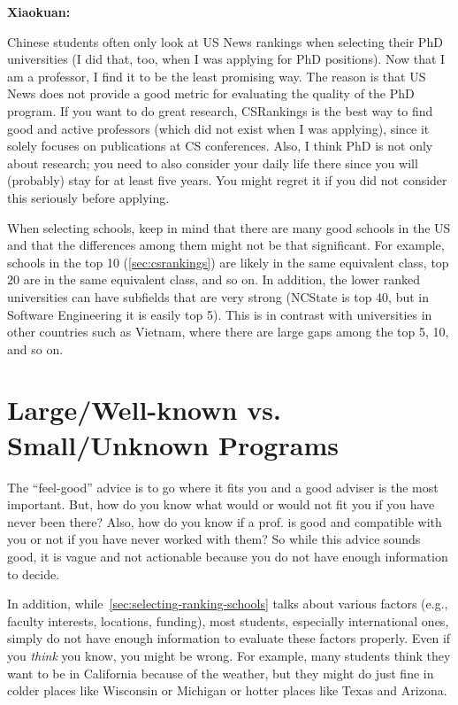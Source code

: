 \documentclass[oneside,11pt]{book}
\newenvironment{commentbox}[1][]{
  \small
  \begin{marker}[\faChessPawn{}]
    {\textbf{#1}}
  }{
  \end{marker}
}
\begin{document}
\begin{commentbox}[Xiaokuan:]
  Chinese students often only look at US News rankings when selecting their PhD universities (I did that, too, when I was applying for PhD positions).
  Now that I am a professor, I find it to be the least promising way.
  The reason is that US News does not provide a good metric for evaluating the quality of the PhD program.
  If you want to do great research, CSRankings is the best way to find good and active professors (which did not exist when I was applying),
  since it solely focuses on publications at  CS conferences.
  Also,
  I think PhD is not only about research;
  you need to also consider your daily life there since you will (probably) stay for at least five years.
  You might regret it if you did not consider this seriously before applying.
\end{commentbox}

\begin{commentbox}
When selecting schools, keep in mind that there are many good schools in the US and that the differences among them might not be that significant.  For example,  schools in the top 10 (\autoref{sec:csrankings}) are likely in the same equivalent class, top 20 are in the same equivalent class, and so on. In addition, the lower ranked universities can have subfields that are very strong (NCState is top 40, but in Software Engineering it is easily top 5).  This is in contrast with universities in other countries such as Vietnam, where there are large gaps among the top 5, 10, and so on.
\end{commentbox}  


\section{Large/Well-known vs. Small/Unknown Programs}

The ``feel-good'' advice is to go where it fits you and a good adviser is the most important. But, how do you know what would or would not fit you if you have never been there?   Also, how do you know if a prof. is good and compatible with you or not if you have never worked with them?  So while this advice sounds good, it is vague and not actionable because you do not have enough information to decide.

In addition, while~\autoref{sec:selecting-ranking-schools} talks about various factors (e.g., faculty interests, locations, funding), most students, especially international ones, simply do not have enough information to evaluate these factors properly.  Even if you \emph{think} you know, you might be wrong.  For example, many students think they want to be in California because of the weather, but they might do just fine in colder places like Wisconsin or Michigan or hotter places like Texas and Arizona.
\end{document}
